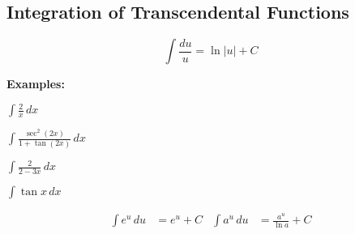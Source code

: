 \documentclass[addpoints, 12pt]{exam}
\begin{document}
\newpage
{}
\subsection*{Integration of Transcendental Functions}
\begin{tcolorbox}[title= INTEGRAL OF \textit{U}^{-1},black,sharp corners,colback=white,colbacktitle=white,coltitle=black,boxrule=1pt]

    \[\displaystyle\int\frac{du}{u}=\ln|u|+C\]
    
\end{tcolorbox}

\noindent\textbf{Examples:}
\begin{questions}
    \begin{minipage}{0.45\linewidth}
        \question $\displaystyle\int\frac{2}{x}\,dx$
    \end{minipage}
    \hfill
    \begin{minipage}{0.45\linewidth}
        \question $\displaystyle\int\frac{\sec^2(2x)}{1+\tan(2x)}\,dx$
    \end{minipage}
    
    
    \begin{minipage}{0.45\linewidth}
        \question $\displaystyle\int\frac{2}{2-3x}\,dx$
    \end{minipage}
    \hfill
    \begin{minipage}{0.45\linewidth}
        \question $\displaystyle\int\tan x\,dx$
    \end{minipage}
    
    
\end{questions}

\begin{tcolorbox}[title= INTEGRAL OF EXPONENTIAL FUNCTIONS,black,sharp corners,colback=white,colbacktitle=white,coltitle=black,boxrule=1pt]

    \begin{align*}
        \displaystyle\int e^u\,du &= e^u +C & \displaystyle\int a^u\,du &= \displaystyle\frac{a^u}{\ln a}+C
    \end{align*}
    
\end{tcolorbox}
\end{document}
